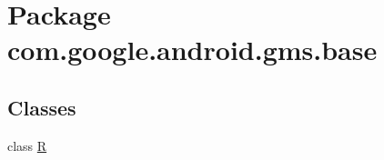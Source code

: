 \hypertarget{namespacecom_1_1google_1_1android_1_1gms_1_1base}{}\section{Package com.\+google.\+android.\+gms.\+base}
\label{namespacecom_1_1google_1_1android_1_1gms_1_1base}
\subsection*{Classes}
\begin{DoxyCompactItemize}
\item 
class \mbox{\hyperlink{classcom_1_1google_1_1android_1_1gms_1_1base_1_1R}{R}}
\end{DoxyCompactItemize}
